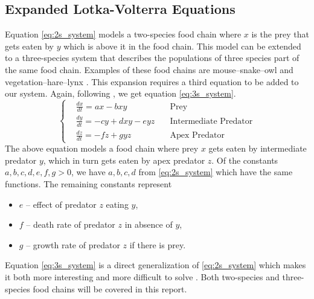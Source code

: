 \documentclass[12pt,a4paper,reqno]{amsart}
\begin{document}

\subsection{Expanded Lotka-Volterra Equations}
Equation \eqref{eq:2s_system} models a two-species food chain where $x$ is the
prey that gets eaten by $y$ which is above it in the food chain. This model can 
be extended to a three-species system that describes the populations of three
species part of the same food chain. Examples of these food chains are
mouse--snake--owl and vegetation--hare--lynx \cite{chauvet}. This expansion
requires a third equation to be added to our system. Again, following
\cite{chauvet}, we get equation \eqref{eq:3s_system}.
\begin{equation}
    \left\{\begin{aligned}
        &\frac{dx}{dt} = ax - bxy              &\text{Prey}\\
        &\frac{dy}{dt} = -cy + dxy - eyz \quad &\text{Intermediate Predator}\\
        &\frac{dz}{dt} = -fz + gyz             &\text{Apex Predator}
    \end{aligned}\right.
    \label{eq:3s_system}
\end{equation}
The above equation models a food chain where prey $x$ gets eaten by
intermediate predator $y$, which in turn gets eaten by apex predator $z$. Of
the constants $a,b,c,d,e,f,g > 0$, we have $a,b,c,d$ from \eqref{eq:2s_system}
which have the same functions. The remaining constants represent
\begin{itemize}
    \item $e$ -- effect of predator $z$ eating $y$,
    \item $f$ -- death rate of predator $z$ in absence of $y$,
    \item $g$ -- growth rate of predator $z$ if there is prey.
\end{itemize}
Equation \eqref{eq:3s_system} is a direct generalization of 
\eqref{eq:2s_system} which makes it both more interesting and more difficult to
solve \cite{chauvet}. Both two-species and three-species food chains will be
covered in this report.

\end{document}
